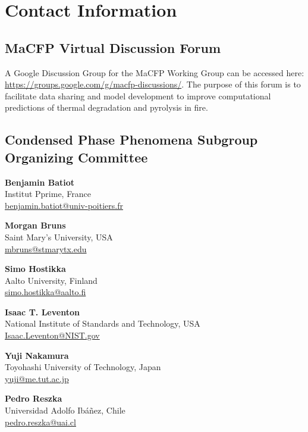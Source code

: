 \documentclass[12pt]{article}
\begin{document}
\clearpage
\section{Contact Information}
 \subsection*{MaCFP Virtual Discussion Forum}
A Google Discussion Group for the MaCFP Working Group can be accessed here: \url{https://groups.google.com/g/macfp-discussions/}. The purpose of this forum is to facilitate data sharing and model development to improve computational predictions of thermal degradation and pyrolysis in fire.

\subsection*{Condensed Phase Phenomena Subgroup Organizing Committee}
\setlength{\parindent}{0cm}
\textbf{Benjamin Batiot} \\
Institut Pprime, France \\
    \quad\href{mailto:benjamin.batiot@univ-poitiers.fr }{benjamin.batiot@univ-poitiers.fr }
    \vspace{0.5cm}
    
\textbf{Morgan Bruns} \\
Saint Mary's University, USA\\
\href{mailto:mbruns@stmarytx.edu}{mbruns@stmarytx.edu}
    \vspace{0.5cm}

\textbf{Simo Hostikka} \\
    Aalto University, Finland\\
    \href{mailto:simo.hostikka@aalto.fi}{simo.hostikka@aalto.fi}
   \vspace{0.5cm}

\textbf{Isaac T. Leventon}\\
     National Institute of Standards and Technology, USA\\
         \href{mailto:isaac.leventon@NIST.gov }{Isaac.Leventon@NIST.gov }
   \vspace{0.5cm}

\textbf{Yuji Nakamura} \\
    Toyohashi University of Technology, Japan\\
    \href{mailto:yuji@me.tut.ac.jp}{yuji@me.tut.ac.jp}
   \vspace{0.5cm}

\textbf{Pedro Reszka} \\
    Universidad Adolfo Ibáñez, Chile\\
    \href{mailto:pedro.reszka@uai.cl}{pedro.reszka@uai.cl}
   \vspace{0.5cm}
\end{document}
